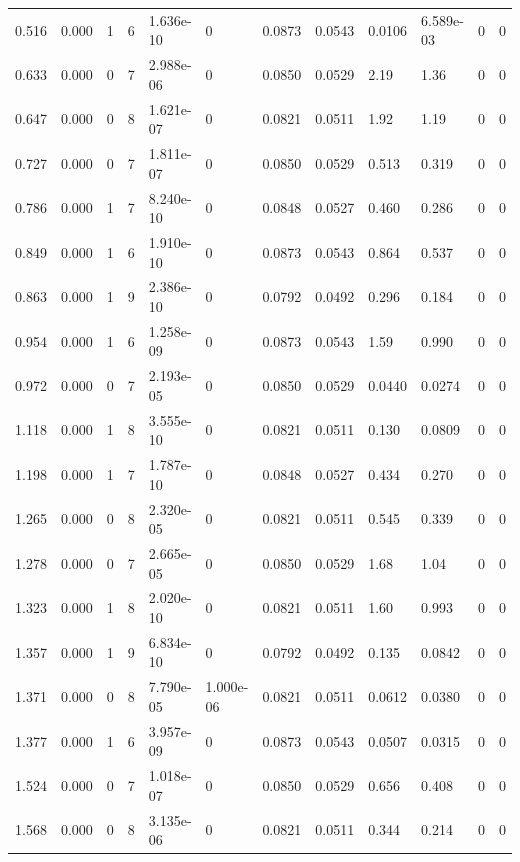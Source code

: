 \documentclass[preview]{standalone}
\begin{document}
{{\begin{tabular}{L{1.2cm}C{1.2cm} C{0.3cm}C{0.5cm} C{1.4cm}C{1.4cm} C{1.4cm}C{1.4cm} C{1.6cm}C{1.6cm} C{1.6cm}C{1.6cm}}
  0.516  &  0.000  & 1     &  6 &  1.636e-10  & 0  &  0.0873&   0.0543& 0.0106 & 6.589e-03   &  0 & 0  \\ 
  0.633  &  0.000  & 0     &  7 &  2.988e-06  & 0  &  0.0850&   0.0529& 2.19 & 1.36   &  0 & 0  \\ 
  0.647  &  0.000  & 0     &  8 &  1.621e-07  & 0  &  0.0821&   0.0511& 1.92 & 1.19   &  0 & 0  \\ 
  0.727  &  0.000  & 0     &  7 &  1.811e-07  & 0  &  0.0850&   0.0529& 0.513 & 0.319   &  0 & 0  \\ 
  0.786  &  0.000  & 1     &  7 &  8.240e-10  & 0  &  0.0848&   0.0527& 0.460 & 0.286   &  0 & 0  \\ 
  0.849  &  0.000  & 1     &  6 &  1.910e-10  & 0  &  0.0873&   0.0543& 0.864 & 0.537   &  0 & 0  \\ 
  0.863  &  0.000  & 1     &  9 &  2.386e-10  & 0  &  0.0792&   0.0492& 0.296 & 0.184   &  0 & 0  \\ 
  0.954  &  0.000  & 1     &  6 &  1.258e-09  & 0  &  0.0873&   0.0543& 1.59 & 0.990   &  0 & 0  \\ 
  0.972  &  0.000  & 0     &  7 &  2.193e-05  & 0  &  0.0850&   0.0529& 0.0440 & 0.0274   &  0 & 0  \\ 
  1.118  &  0.000  & 1     &  8 &  3.555e-10  & 0  &  0.0821&   0.0511& 0.130 & 0.0809   &  0 & 0  \\ 
  1.198  &  0.000  & 1     &  7 &  1.787e-10  & 0  &  0.0848&   0.0527& 0.434 & 0.270   &  0 & 0  \\ 
  1.265  &  0.000  & 0     &  8 &  2.320e-05  & 0  &  0.0821&   0.0511& 0.545 & 0.339   &  0 & 0  \\ 
  1.278  &  0.000  & 0     &  7 &  2.665e-05  & 0  &  0.0850&   0.0529& 1.68 & 1.04   &  0 & 0  \\ 
  1.323  &  0.000  & 1     &  8 &  2.020e-10  & 0  &  0.0821&   0.0511& 1.60 & 0.993   &  0 & 0  \\ 
  1.357  &  0.000  & 1     &  9 &  6.834e-10  & 0  &  0.0792&   0.0492& 0.135 & 0.0842   &  0 & 0  \\ 
  1.371  &  0.000  & 0     &  8 &  7.790e-05  & 1.000e-06  &  0.0821&   0.0511& 0.0612 & 0.0380   &  0 & 0  \\ 
  1.377  &  0.000  & 1     &  6 &  3.957e-09  & 0  &  0.0873&   0.0543& 0.0507 & 0.0315   &  0 & 0  \\ 
  1.524  &  0.000  & 0     &  7 &  1.018e-07  & 0  &  0.0850&   0.0529& 0.656 & 0.408   &  0 & 0  \\ 
  1.568  &  0.000  & 0     &  8 &  3.135e-06  & 0  &  0.0821&   0.0511& 0.344 & 0.214   &  0 & 0  \\ 

\end{tabular}}}
\end{document}
